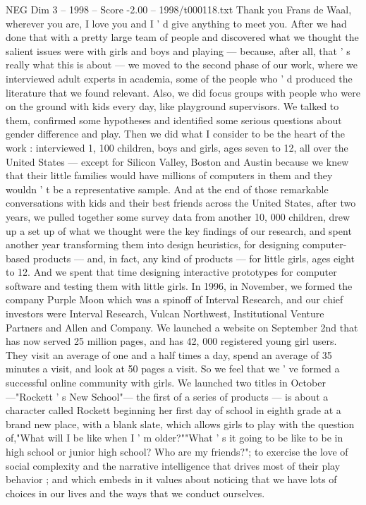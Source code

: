 \begin{textsample}{NEG Dim 3 – 1998 – Score -2.00 – 1998/t000118.txt}
Thank you Frans de Waal, wherever you are, I love you and I ' d give anything to meet you.
After we had done that with a pretty large team of people and discovered what we thought the salient issues were with girls and boys and playing — because, after all, that ' s really what this is about — we moved to the second phase of our work, where we interviewed adult experts in academia, some of the people who ' d produced the literature that we found relevant.
Also, we did focus groups with people who were on the ground with kids every day, like playground supervisors.
We talked to them, confirmed some hypotheses and identified some serious questions about gender difference and play.
Then we did what I consider to be the heart of the work : interviewed 1, 100 children, boys and girls, ages seven to 12, all over the United States — except for Silicon Valley, Boston and Austin because we knew that their little families would have millions of computers in them and they wouldn ' t be a representative sample.
And at the end of those remarkable conversations with kids and their best friends across the United States, after two years, we pulled together some survey data from another 10, 000 children, drew up a set up of what we thought were the key findings of our research, and spent another year transforming them into design heuristics, for designing computer-based products — and, in fact, any kind of products — for little girls, ages eight to 12.
And we spent that time designing interactive prototypes for computer software and testing them with little girls.
In 1996, in November, we formed the company Purple Moon which was a spinoff of Interval Research, and our chief investors were Interval Research, Vulcan Northwest, Institutional Venture Partners and Allen and Company.
We launched a website on September 2nd that has now served 25 million pages, and has 42, 000 registered young girl users.
They visit an average of one and a half times a day, spend an average of 35 minutes a visit, and look at 50 pages a visit.
So we feel that we ' ve formed a successful online community with girls.
We launched two titles in October —"Rockett ' s New School"— the first of a series of products — is about a character called Rockett beginning her first day of school in eighth grade at a brand new place, with a blank slate, which allows girls to play with the question of,"What will I be like when I ' m older?""What ' s it going to be like to be in high school or junior high school?
Who are my friends?"; to exercise the love of social complexity and the narrative intelligence that drives most of their play behavior ; and which embeds in it values about noticing that we have lots of choices in our lives and the ways that we conduct ourselves.

\end{textsample}
